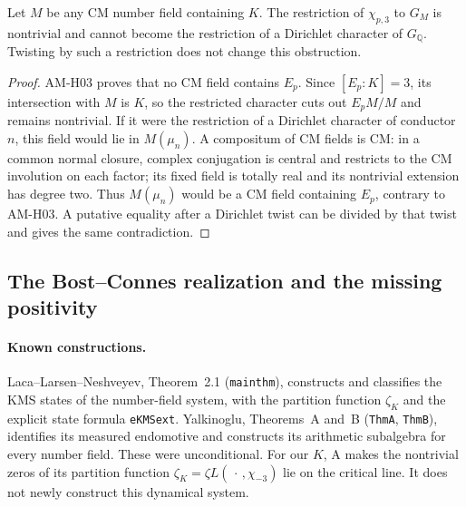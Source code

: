 \begin{proposition}
\label{AC-K06}
Let $M$ be any CM number field containing $K$. The restriction
of $\chi_{p,3}$ to $G_M$ is nontrivial and cannot become the
restriction of a Dirichlet character of $G_{\mathbb Q}$.
Twisting by such a restriction does not change this obstruction.
\end{proposition}
\begin{proof}
AM-H03 proves that no CM field contains $E_p$.
Since $[E_p:K]=3$, its intersection with $M$ is $K$, so the
restricted character cuts out $E_pM/M$ and remains nontrivial.
If it were the restriction of a Dirichlet character of conductor
$n$, this field would lie in $M(\mu_n)$. A compositum of CM
fields is CM: in a common normal closure, complex conjugation
is central and restricts to the CM involution on each factor;
its fixed field is totally real and its nontrivial extension
has degree two. Thus $M(\mu_n)$ would be a CM field containing
$E_p$, contrary to AM-H03. A putative equality after a
Dirichlet twist can be divided by that twist and gives the
same contradiction.
\end{proof}

\subsection{The Bost--Connes realization and the missing positivity}

\paragraph{Known constructions.}
Laca--Larsen--Neshveyev, Theorem~2.1 (\texttt{mainthm}),
constructs and classifies the KMS states of the number-field
system, with the partition function $\zeta_K$ and the explicit
state formula \texttt{eKMSext}. Yalkinoglu, Theorems~A and~B
(\texttt{ThmA}, \texttt{ThmB}), identifies its measured
endomotive and constructs its arithmetic subalgebra for every
number field. These were unconditional. For our $K$, A makes
the nontrivial zeros of its partition function
$\zeta_K=\zeta L(\,\cdot\,,\chi_{-3})$ lie on the critical
line. It does not newly construct this dynamical system.

